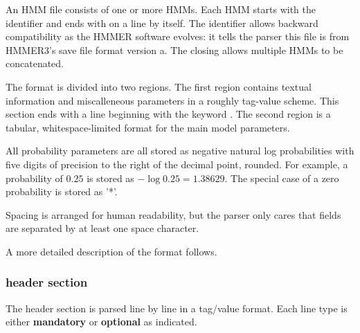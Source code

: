 An HMM file consists of one or more HMMs.  Each HMM starts with the
identifier  and ends with \prog{//} on a line by
itself.  The identifier allows backward compatibility as the HMMER
software evolves: it tells the parser this file is from HMMER3's save
file format version a.  The closing \prog{//} allows multiple HMMs to
be concatenated.

The format is divided into two regions. The first region contains
textual information and miscalleneous parameters in a roughly
tag-value scheme.  This section ends with a line beginning with the
keyword . The second region is a tabular, whitespace-limited
format for the main model parameters.

All probability parameters are all stored as negative natural log
probabilities with five digits of precision to the right of the
decimal point, rounded. For example, a probability of $0.25$ is stored
as $-\log 0.25 = 1.38629$. The special case of a zero probability is
stored as '*'.

Spacing is arranged for human readability, but the parser only cares
that fields are separated by at least one space character.

A more detailed description of the format follows.

\subsubsection{header section}

The header section is parsed line by line in a tag/value format. Each
line type is either \textbf{mandatory} or \textbf{optional} as
indicated. 

